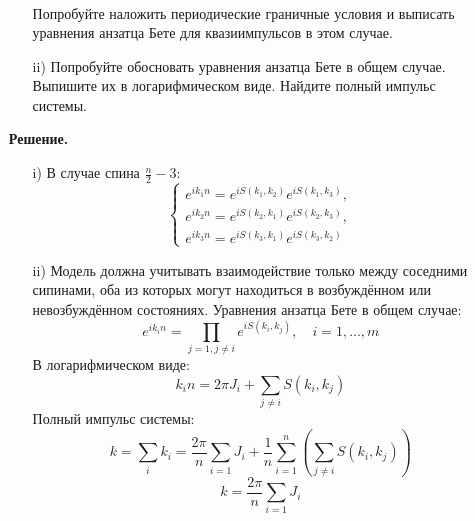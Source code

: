 \documentclass[12pt]{article}
\theoremstyle{definition}
\begin{document}
\begin{enumerate}
\begin{itemize}
\begin{multline}
            \end{multline}
            Попробуйте наложить периодические граничные условия и выписать уравнения анзатца Бете для квазиимпульсов в этом случае.
            \item[ii)] Попробуйте обосновать уравнения анзатца Бете в общем случае. Выпишите их в логарифмическом виде. Найдите полный импульс системы.
        \end{itemize}
        \textbf{Решение.}
        \begin{itemize}
            \item[i)]
            В случае спина $\frac{n}{2}-3$:
            \begin{equation}
            \boxed{\begin{cases}
                e^{ik_1n}=e^{iS(k_1,k_2)}e^{iS(k_1,k_3)},\\
                e^{ik_2n}=e^{iS(k_2,k_1)}e^{iS(k_2,k_3)},\\
                e^{ik_3n}=e^{iS(k_3,k_1)}e^{iS(k_3,k_2)}
            \end{cases}}
            \end{equation}
            \item[ii)] Модель должна учитывать взаимодействие только между соседними сипинами, оба из которых могут находиться в возбуждённом или невозбуждённом состояниях.
            Уравнения анзатца Бете в общем случае:
            \begin{equation}
                \boxed{e^{ik_in}=\prod\limits_{j=1,j\neq i}e^{iS(k_i,k_j)},\quad i=1,...,m}
            \end{equation}
            В логарифмическом виде:
            \begin{equation}
                \boxed{k_in=2\pi J_i+\sum\limits_{j\neq i}S(k_i,k_j)}
            \end{equation}
            Полный импульс системы:
            \begin{equation}
                k=\sum\limits_{i}k_i=\frac{2\pi}{n}\sum\limits_{i=1}J_i+\frac{1}{n}\sum\limits_{i=1}^n\left(\sum\limits_{j\neq i} S(k_i,k_j)\right)
            \end{equation}
            \begin{equation}
                \boxed{k=\frac{2\pi}{n}\sum\limits_{i=1}J_i}
            \end{equation}
        \end{itemize}
\end{enumerate}
\end{document}

